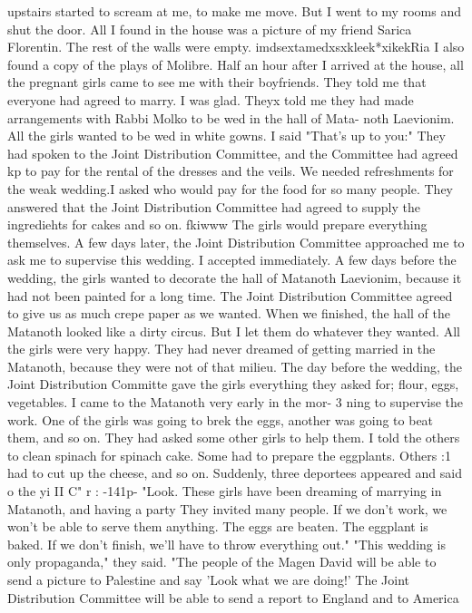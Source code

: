 upstairs started to scream at me, to make me move.
But I went to my rooms and shut the 
door.
All I found in the house was a picture of my friend Sarica Florentin.
The rest 
of the walls were empty.
imdsextamedxsxkleek*xikekRia I also found a copy of the plays 
of Molibre.
Half an hour after I arrived at the house, all the pregnant girls came to see me 
with their boyfriends.
They told me that everyone had agreed to marry.
I was glad.
Theyx told me they had made arrangements with Rabbi Molko to be wed in the hall of Mata-
noth Laevionim.
All the girls wanted to be wed in white gowns.
I said "That's up to 
you:" They had spoken to the Joint Distribution Committee, and the Committee had agreed 
kp to pay for the rental of the dresses and the veils.
We needed refreshments for the weak 
wedding.I asked who would pay for the food for so many people.
They answered that the 
Joint Distribution Committee had agreed to supply the ingrediehts for cakes and so on.
fkiwww The girls would prepare everything themselves.
A few days later, the Joint Distribution Committee approached me to ask me to 
supervise this wedding.
I accepted immediately.
A few days before the wedding, the girls 
wanted to decorate the hall of Matanoth Laevionim, because it had not been painted for 
a long time.
The Joint Distribution Committee agreed to give us as much crepe paper 
as we wanted.
When we finished, the hall of the Matanoth looked like a dirty circus.
But I let them do whatever they wanted.
All the girls were very happy.
They had never 
dreamed of getting married in the Matanoth, because they were not of that milieu.
The day before the wedding, the Joint Distribution Committe gave the girls everything 
they asked for; flour, eggs, vegetables.
I came to the Matanoth very early in the mor-
3 
ning to supervise the work.
One of the girls was going to brek the eggs, another was 
going to beat them, and so on.
They had asked some other girls to help them.
I told 
the others to clean spinach for spinach cake.
Some had to prepare the eggplants.
Others 
:1 had to cut up the cheese, and so on.
Suddenly, three deportees appeared and said o the yi 
II C" 
r : 
-141p-
"Look.
These girls have been dreaming of marrying in Matanoth, and having a party 
They invited many people.
If we don't work, we won't be able to serve them anything.
The eggs are beaten.
The eggplant is baked.
If we don't finish, we'll have to throw 
everything out."
"This wedding is only propaganda," they said.
"The people of the Magen David 
will be able to send a picture to Palestine and say 'Look what we are doing!'
The 
Joint Distribution Committee will be able to send a report to England and to America 
